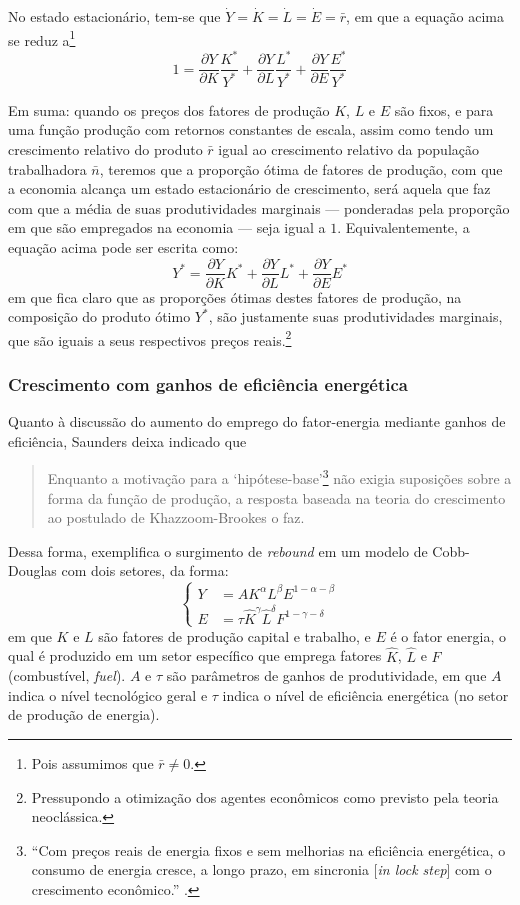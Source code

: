 No estado estacionário, tem-se que $\dot{Y}=\dot{K}=\dot{L}=\dot{E}=\bar{r}$, em que a equação acima se reduz a\footnote{Pois assumimos que $\bar{r}\neq 0$.}
$$
1 =  \frac{ \partial Y }{ \partial K } \frac{K^{*}}{Y^{*}} + \frac{ \partial Y }{ \partial L }  \frac{L^{*}}{Y^{*}} + \frac{ \partial Y }{ \partial E } \frac{E^{*}}{Y^{*}} 
$$

Em suma: quando os preços dos fatores de produção $K$, $L$ e $E$ são fixos, e para uma função produção com retornos constantes de escala, assim como tendo um crescimento relativo do produto $\bar{r}$ igual ao crescimento relativo da população trabalhadora $\bar{n}$, teremos que a proporção ótima de fatores de produção, com que a economia alcança um estado estacionário de crescimento, será aquela que faz com que a média de suas produtividades marginais — ponderadas pela proporção em que são empregados na economia — seja igual a $1$. Equivalentemente, a equação acima pode ser escrita como:
$$
Y^* = \frac{ \partial Y }{ \partial K } K^{*} + \frac{ \partial Y }{ \partial L }  L^{*} + \frac{ \partial Y }{ \partial E } E^{*}
$$
em que fica claro que as proporções ótimas destes fatores de produção, na composição do produto ótimo $Y^*$, são justamente suas produtividades marginais, que são iguais a seus respectivos preços reais.\footnote{Pressupondo a otimização dos agentes econômicos como previsto pela teoria neoclássica.}


\subsubsection{Crescimento com ganhos de eficiência energética}
Quanto à discussão do aumento do emprego do fator-energia mediante ganhos de eficiência, Saunders deixa indicado que
\begin{quote}
    Enquanto a motivação para a `hipótese-base'\footnote{``Com preços reais de energia fixos e sem melhorias na eficiência energética, o consumo de energia cresce, a longo prazo, em sincronia [\textit{in lock step}] com o crescimento econômico.'' \parencite[p. 134]{Saunders1992}.} não exigia suposições sobre a forma da função de produção, a resposta baseada na teoria do crescimento ao postulado de Khazzoom-Brookes o faz. \parencite[p. 136]{Saunders1992}
\end{quote}

Dessa forma, \textcite{Saunders2000} exemplifica o surgimento de \textit{rebound} em um modelo de Cobb-Douglas com dois setores, da forma:
$$
\begin{cases}
Y&=A K^{\alpha}L^{\beta}E^{1-\alpha-\beta} \\
E&=\tau \hat{K}^{\gamma}\hat{L}^{\delta}F^{1-\gamma-\delta}
\end{cases}
$$
em que $K$ e $L$ são fatores de produção capital e trabalho, e $E$ é o fator energia, o qual é produzido em um setor específico que emprega fatores $\hat{K}$, $\hat{L}$ e $F$ (combustível, \textit{fuel}). $A$ e $\tau$ são parâmetros de ganhos de produtividade, em que $A$ indica o nível tecnológico geral e $\tau$ indica o nível de eficiência energética (no setor de produção de energia). 

